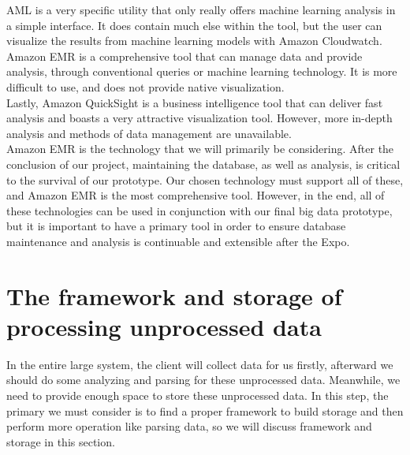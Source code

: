 \documentclass[10pt,draftclsnofoot,onecolumn,journal,compsoc]{IEEEtran}
\begin{document}
        \noindent AML is a very specific utility that only really offers machine learning analysis in a simple interface. It does contain much else within the tool, but the user can visualize the results from machine learning models with Amazon Cloudwatch.\\ 
        
        \noindent Amazon EMR is a comprehensive tool that can manage data and provide analysis, through conventional queries or machine learning technology. It is more difficult to use, and does not provide native visualization.\\ 

        \noindent Lastly, Amazon QuickSight is a business intelligence tool that can deliver fast analysis and boasts a very attractive visualization tool. However, more in-depth analysis and methods of data management are unavailable.\\

        \noindent Amazon EMR is the technology that we will primarily be considering. After the conclusion of our project, maintaining the database, as well as analysis, is critical to the survival of our prototype. Our chosen technology must support all of these, and Amazon EMR is the most comprehensive tool. However, in the end, all of these technologies can be used in conjunction with our final big data prototype, but it is important to have a primary tool in order to ensure database maintenance and analysis is continuable and extensible after the Expo.\\
    
       \section{The framework and storage of processing unprocessed data}
        In the entire large system, the client will collect data for us firstly, afterward we should do some analyzing and parsing for these unprocessed data. Meanwhile, we need to provide enough space to store these unprocessed data. In this step, the primary we must consider is to find a proper framework to build storage and then perform more operation like parsing data, so we will discuss framework and storage in this section.\\
\end{document}
